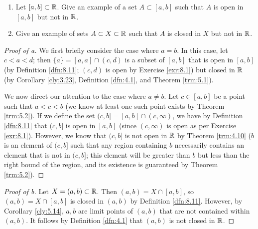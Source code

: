 \documentclass[../main.tex]{subfiles}
\begin{document}
\begin{exercise}\label{exr:8.14}\leavevmode
    \begin{enumerate}[label={\alph*)},ref={\theexercise\alph*}]
        \item \label{exr:8.14a}Let $[a,b]\subset\mathbb{R}$. Give an example of a set $A\subset[a,b]$ such that $A$ is open in $[a,b]$ but not in $\mathbb{R}$.
        \item \label{exr:8.14b}Give an example of sets $A\subset X\subset\mathbb{R}$ such that $A$ is closed in $X$ but not in $\mathbb{R}$.
    \end{enumerate}
    \begin{proof}[Proof of a]
        We first briefly consider the case where $a=b$. In this case, let $c<a<d$; then $\{a\}=[a,a]\cap(c,d)$ is a subset of $[a,b]$ that is open in $[a,b]$ (by Definition \ref{dfn:8.11}; $(c,d)$ is open by Exercise \ref{exr:8.1}) but closed in $\mathbb{R}$ (by Corollary \ref{cly:3.23}, Definition \ref{dfn:4.1}, and Theorem \ref{trm:5.1}).\par
        We now direct our attention to the case where $a\neq b$. Let $c\in[a,b]$ be a point such that $a<c<b$ (we know at least one such point exists by Theorem \ref{trm:5.2}). If we define the set $(c,b]=[a,b]\cap(c,\infty)$, we have by Definition \ref{dfn:8.11} that $(c,b]$ is open in $[a,b]$ (since $(c,\infty)$ is open as per Exercise \ref{exr:8.1}). However, we know that $(c,b]$ is not open in $\mathbb{R}$ by Theorem \ref{trm:4.10} ($b$ is an element of $(c,b]$ such that any region containing $b$ necessarily contains an element that is not in $(c,b]$; this element will be greater than $b$ but less than the right bound of the region, and its existence is guaranteed by Theorem \ref{trm:5.2}).
    \end{proof}
    \begin{proof}[Proof of b]
        Let $X=(a,b)\subset\mathbb{R}$. Then $(a,b)=X\cap[a,b]$, so $(a,b)=X\cap[a,b]$ is closed in $(a,b)$ by Definition \ref{dfn:8.11}. However, by Corollary \ref{cly:5.14}, $a,b$ are limit points of $(a,b)$ that are not contained within $(a,b)$. It follows by Definition \ref{dfn:4.1} that $(a,b)$ is not closed in $\mathbb{R}$.
    \end{proof}
\end{exercise}
\end{document}
